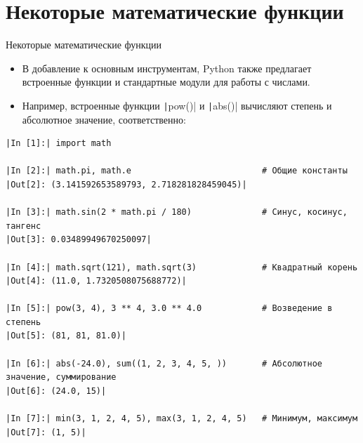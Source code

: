 \documentclass[aspectratio=169]{beamer}	%
\begin{document}
\section{Некоторые математические функции}
\sectionframe

\begin{frame}[fragile]{Некоторые математические функции}
\scriptsize
\begin{itemize}
	\item В добавление к основным инструментам, Python также предлагает встроенные функции и стандартные модули для работы с числами.
	\item Например, встроенные функции \texttt|pow()| и \texttt|abs()| вычисляют степень и абсолютное значение, соответственно:
\end{itemize}
\begin{verbatim}
|In [1]:| import math

|In [2]:| math.pi, math.e                          # Общие константы
|Out[2]: (3.141592653589793, 2.718281828459045)|

|In [3]:| math.sin(2 * math.pi / 180)              # Синус, косинус, тангенс
|Out[3]: 0.03489949670250097|

|In [4]:| math.sqrt(121), math.sqrt(3)             # Квадратный корень
|Out[4]: (11.0, 1.7320508075688772)|

|In [5]:| pow(3, 4), 3 ** 4, 3.0 ** 4.0            # Возведение в степень
|Out[5]: (81, 81, 81.0)|

|In [6]:| abs(-24.0), sum((1, 2, 3, 4, 5, ))       # Абсолютное значение, суммирование
|Out[6]: (24.0, 15)|

|In [7]:| min(3, 1, 2, 4, 5), max(3, 1, 2, 4, 5)   # Минимум, максимум
|Out[7]: (1, 5)|
\end{verbatim}
\vfill
\end{frame}
\end{document}
